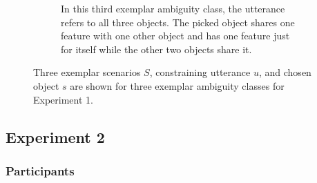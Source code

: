 \documentclass[10pt,a4paper]{article}
\begin{document}
\begin{figure}[htb]
\begin{subfigure}{\linewidth}
\begin{subfigure}[b]{0.3\linewidth}
	\end{subfigure}
	\hspace*{0.3cm}
	\begin{subfigure}[b]{0.3\linewidth}
	\end{subfigure}
	\caption{In this third exemplar ambiguity class, the utterance refers to all three objects. The picked object shares one feature with one other object and has one feature just for itself while the other two objects share it.}
	\end{subfigure}
	\caption{Three exemplar scenarios $S$, constraining utterance $u$, and chosen object $s$ are shown for three exemplar ambiguity classes for Experiment 1.}
\label{fig:ambiguity-classes-exp1}
\end{figure}




\subsection*{Experiment 2}

\subsubsection*{Participants}
\end{document}
